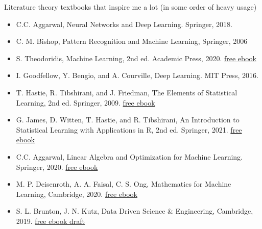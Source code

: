 \documentclass[mathserif, aspectratio=1610]{intbeamer}
\begin{document}
\begin{frame}{Literature}
  theory textbooks that inspire me a lot (in some order of heavy usage)
  \begin{itemize}
    \item C.C. Aggarwal, Neural Networks and Deep Learning. Springer, 2018.
    \item C. M. Bishop, Pattern Recognition and Machine Learning, Springer, 2006
    \item S. Theodoridis, Machine Learning, 2nd ed. Academic Press, 2020.
    \href{https://www.sciencedirect.com/book/9780128188033/machine-learning}{free ebook}
    \item I. Goodfellow, Y. Bengio, and A. Courville, Deep Learning. MIT Press, 2016.
    \item T. Hastie, R. Tibshirani, and J. Friedman, The Elements of Statistical Learning, 2nd ed. Springer, 2009.
    \href{https://hastie.su.domains/ElemStatLearn/}{free ebook}
    \item G. James, D. Witten, T. Hastie, and R. Tibshirani, An Introduction to Statistical Learning with Applications in R, 2nd ed. Springer, 2021. \href{https://www.statlearning.com/}{free ebook}
    \item C.C. Aggarwal, Linear Algebra and Optimization for Machine Learning. Springer, 2020. \href{https://link.springer.com/book/10.1007/978-3-030-40344-7}{free ebook}
    \item M. P. Deisenroth, A. A. Faisal, C. S. Ong, Mathematics for Machine Learning, Cambridge, 2020. \href{https://mml-book.github.io/book/mml-book.pdf}{free ebook}
    \item S. L. Brunton, J. N. Kutz, Data Driven Science \& Engineering, Cambridge, 2019. \href{http://www.databookuw.com/databook.pdf}{free ebook draft}
  \end{itemize}
\end{frame}
\end{document}
